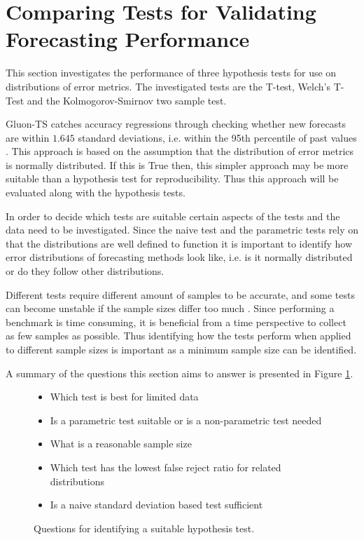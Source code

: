 \section{Comparing Tests for Validating Forecasting Performance}
\label{sec:compairing_hypothesis_tests}
This section investigates the performance of three hypothesis tests for use on distributions of error metrics. The investigated tests are the T-test, Welch’s T-Test and the Kolmogorov-Smirnov two sample test.

Gluon-TS catches accuracy regressions through checking whether new forecasts are within \(1.645\) standard deviations, i.e. within the 95th percentile of past values \cite{gluonts-github}. This approach is based on the assumption that the distribution of error metrics is normally distributed. If this is True then, this simpler approach may be more suitable than a hypothesis test for reproducibility. Thus this approach will be evaluated along with the hypothesis tests.

In order to decide which tests are suitable certain aspects of the tests and the data need to be investigated. Since the naive test and the parametric tests rely on that the distributions are well defined to function it is important to identify how error distributions of forecasting methods look like, i.e. is it normally distributed or do they follow other distributions.

Different tests require different amount of samples to be accurate, and some tests can become unstable if the sample sizes differ too much \cite{hassani2015kolmogorov, student_or_welch}. Since performing a benchmark is time consuming, it is beneficial from a time perspective to collect as few samples as possible. Thus identifying how the tests perform when applied to different sample sizes is important as a minimum sample size can be identified.

A summary of the questions this section aims to answer is presented in Figure \ref{fig:reproducibility_questions}.

\begin{figure}
    \begin{itemize}
        \item Which test is best for limited data
        \item Is a parametric test suitable or is a non-parametric test needed
        \item What is a reasonable sample size
        \item Which test has the lowest false reject ratio for related distributions
        \item Is a naive standard deviation based test sufficient
    \end{itemize}
    \caption{Questions for identifying a suitable hypothesis test.}
    \label{fig:reproducibility_questions}
\end{figure}

